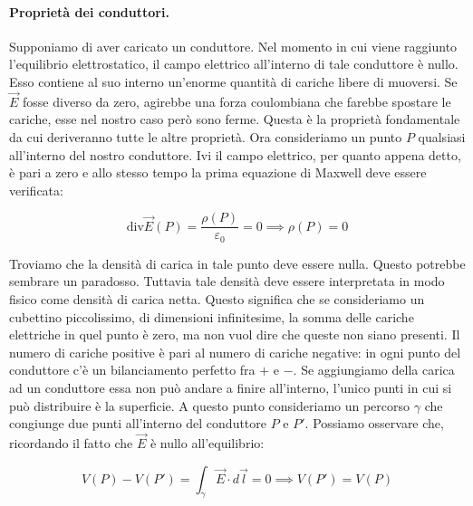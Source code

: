\paragraph{Proprietà dei conduttori.} Supponiamo di aver caricato un conduttore. Nel momento in cui viene raggiunto l'equilibrio elettrostatico, il campo elettrico all'interno di tale conduttore è nullo. Esso contiene al suo interno un'enorme quantità di cariche libere di muoversi. Se $\vec{E} $ fosse diverso da zero, agirebbe una forza coulombiana che farebbe spostare le cariche, esse nel nostro caso però sono ferme. Questa è la proprietà fondamentale da cui deriveranno tutte le altre proprietà.
Ora consideriamo un punto $P$ qualsiasi all'interno del nostro conduttore. Ivi il campo elettrico, per quanto appena detto, è pari a zero e allo stesso tempo la prima equazione di Maxwell deve essere verificata:

\[
	\text{div}\vec{E} (P)=\frac{\rho (P)}{\varepsilon_0} = 0 \implies \rho (P)=0
\]

Troviamo che la densità di carica in tale punto deve essere nulla. Questo potrebbe sembrare un paradosso. Tuttavia tale densità deve essere interpretata in modo fisico come densità di carica netta. Questo significa che se consideriamo un cubettino piccolissimo, di dimensioni infinitesime, la somma delle cariche elettriche in quel punto è zero, ma non vuol dire che queste non siano presenti. Il numero di cariche positive è pari al numero di cariche negative: in ogni punto del conduttore c'è un bilanciamento perfetto fra $+$ e $-$. Se aggiungiamo della carica ad un conduttore essa non può andare a finire all'interno, l'unico punti in cui si può distribuire è la superficie. A questo punto consideriamo un percorso $ \gamma  $ che congiunge due punti all'interno del conduttore $P$ e $P'$. Possiamo osservare che, ricordando il fatto che $\vec{E} $ è nullo all'equilibrio:

\[
	V(P)-V(P') = \int_{\gamma}\vec{E} \cdot d\vec{l} =0 \implies V(P') = V(P)
\]

